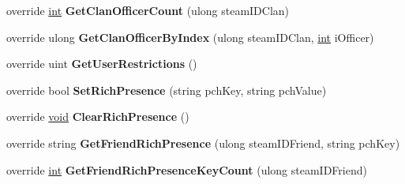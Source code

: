 \begin{DoxyCompactItemize}
\item 
\hypertarget{classValve_1_1Steamworks_1_1CSteamFriends_a6f908cad7fb0e28f781df2009bff79ef}{}override \hyperlink{SDL__thread_8h_a6a64f9be4433e4de6e2f2f548cf3c08e}{int} {\bfseries Get\+Clan\+Officer\+Count} (ulong steam\+I\+D\+Clan)\label{classValve_1_1Steamworks_1_1CSteamFriends_a6f908cad7fb0e28f781df2009bff79ef}

\item 
\hypertarget{classValve_1_1Steamworks_1_1CSteamFriends_a990f120e2b232e9726df1440c95ad1c4}{}override ulong {\bfseries Get\+Clan\+Officer\+By\+Index} (ulong steam\+I\+D\+Clan, \hyperlink{SDL__thread_8h_a6a64f9be4433e4de6e2f2f548cf3c08e}{int} i\+Officer)\label{classValve_1_1Steamworks_1_1CSteamFriends_a990f120e2b232e9726df1440c95ad1c4}

\item 
\hypertarget{classValve_1_1Steamworks_1_1CSteamFriends_ab3fe6cef1b869960151bf88129366d58}{}override uint {\bfseries Get\+User\+Restrictions} ()\label{classValve_1_1Steamworks_1_1CSteamFriends_ab3fe6cef1b869960151bf88129366d58}

\item 
\hypertarget{classValve_1_1Steamworks_1_1CSteamFriends_ab4ef24b7e5d16fd22842aaefc62f8af2}{}override bool {\bfseries Set\+Rich\+Presence} (string pch\+Key, string pch\+Value)\label{classValve_1_1Steamworks_1_1CSteamFriends_ab4ef24b7e5d16fd22842aaefc62f8af2}

\item 
\hypertarget{classValve_1_1Steamworks_1_1CSteamFriends_a4c63d6bccfee7c33518f8f441ea8d5ec}{}override \hyperlink{SDL__audio_8h_a52835ae37c4bb905b903cbaf5d04b05f}{void} {\bfseries Clear\+Rich\+Presence} ()\label{classValve_1_1Steamworks_1_1CSteamFriends_a4c63d6bccfee7c33518f8f441ea8d5ec}

\item 
\hypertarget{classValve_1_1Steamworks_1_1CSteamFriends_a4ddac1901d98e58ad9c04d570d5ae3ec}{}override string {\bfseries Get\+Friend\+Rich\+Presence} (ulong steam\+I\+D\+Friend, string pch\+Key)\label{classValve_1_1Steamworks_1_1CSteamFriends_a4ddac1901d98e58ad9c04d570d5ae3ec}

\item 
\hypertarget{classValve_1_1Steamworks_1_1CSteamFriends_a7c09e8defbacf997a5262135a4e3a1a1}{}override \hyperlink{SDL__thread_8h_a6a64f9be4433e4de6e2f2f548cf3c08e}{int} {\bfseries Get\+Friend\+Rich\+Presence\+Key\+Count} (ulong steam\+I\+D\+Friend)\label{classValve_1_1Steamworks_1_1CSteamFriends_a7c09e8defbacf997a5262135a4e3a1a1}


\end{DoxyCompactItemize}
